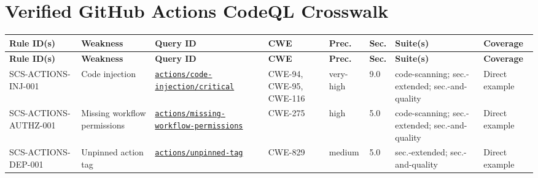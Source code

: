 \documentclass[10pt,letterpaper]{article}
\newcommand{\code}[1]{\texttt{\small #1}}
\begin{document}
\section{Verified GitHub Actions CodeQL Crosswalk}\begin{landscape}\scriptsize
\setlength{\tabcolsep}{2.6pt}
\begin{longtable}{@{}P{1.28in}P{1.12in}P{1.52in}P{0.78in}P{0.52in}P{0.48in}P{1.32in}P{0.82in}@{}}
\toprule
\textbf{Rule ID(s)} & \textbf{Weakness} & \textbf{Query ID} & \textbf{CWE} & \textbf{Prec.} & \textbf{Sec.} & \textbf{Suite(s)} & \textbf{Coverage}\\
\midrule
\endfirsthead
\toprule
\textbf{Rule ID(s)} & \textbf{Weakness} & \textbf{Query ID} & \textbf{CWE} & \textbf{Prec.} & \textbf{Sec.} & \textbf{Suite(s)} & \textbf{Coverage}\\
\midrule
\endhead
SCS-ACTIONS-INJ-001 & Code injection & \href{https://codeql.github.com/codeql-query-help/actions/actions-code-injection-critical/}{\code{actions/\allowbreak code-\allowbreak injection/\allowbreak critical}} & CWE-94, CWE-95, CWE-116 & very-high & 9.0 & code-scanning; sec.-extended; sec.-and-quality & Direct example\\
SCS-ACTIONS-AUTHZ-001 & Missing workflow permissions & \href{https://codeql.github.com/codeql-query-help/actions/actions-missing-workflow-permissions/}{\code{actions/\allowbreak missing-\allowbreak workflow-\allowbreak permissions}} & CWE-275 & high & 5.0 & code-scanning; sec.-extended; sec.-and-quality & Direct example\\
SCS-ACTIONS-DEP-001 & Unpinned action tag & \href{https://codeql.github.com/codeql-query-help/actions/actions-unpinned-tag/}{\code{actions/\allowbreak unpinned-\allowbreak tag}} & CWE-829 & medium & 5.0 & sec.-extended; sec.-and-quality & Direct example\\
\bottomrule
\end{longtable}
\normalsize\end{landscape}
\end{document}
